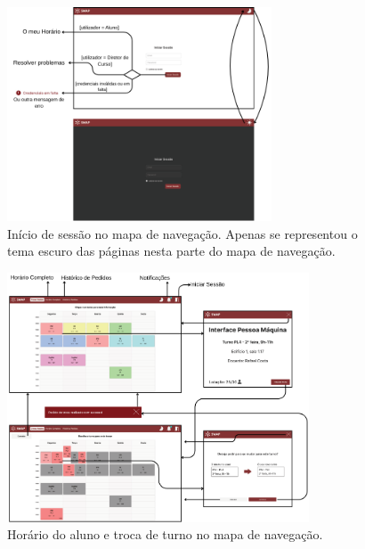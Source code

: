\documentclass[12pt, a4paper]{article}
\begin{document}
\begin{figure}[H]
    \centering
    \includegraphics[width=0.7\textwidth]{res/navigation/1.png}
    \caption{
        \onehalfspacing
        Início de sessão no mapa de navegação. Apenas se representou o tema escuro das páginas nesta
        parte do mapa de navegação.
    }
    \label{navigation-1}
\end{figure}

\begin{figure}[H]
    \centering
    \includegraphics[width=0.8\textwidth]{res/navigation/2.png}
    \caption{Horário do aluno e troca de turno no mapa de navegação.}
    \label{navigation-2}
\end{figure}
\end{document}

